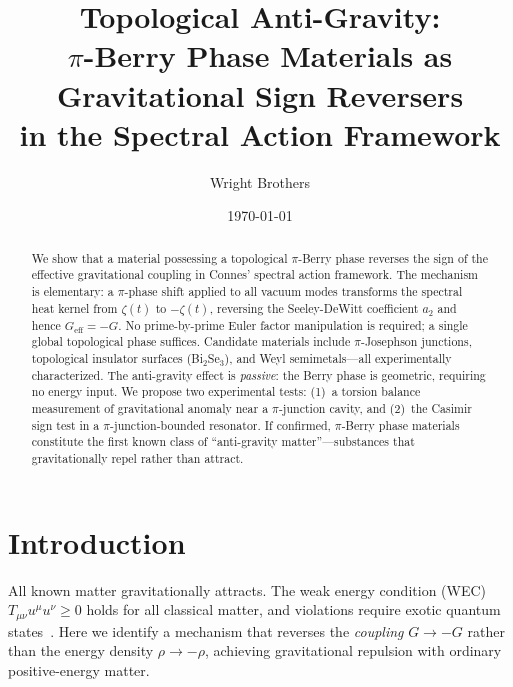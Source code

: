\documentclass[aps,prl,twocolumn,superscriptaddress,nofootinbib]{revtex4-2}
\begin{document}
\title{Topological Anti-Gravity:\\
$\pi$-Berry Phase Materials as Gravitational Sign Reversers\\
in the Spectral Action Framework}

\author{Wright Brothers}
\date{\today}

\begin{abstract}
We show that a material possessing a topological $\pi$-Berry phase
reverses the sign of the effective gravitational coupling
in Connes' spectral action framework.
The mechanism is elementary:
a $\pi$-phase shift applied to all vacuum modes transforms the
spectral heat kernel from $\zeta(t)$ to $-\zeta(t)$,
reversing the Seeley-DeWitt coefficient $a_2$ and hence
$G_{\mathrm{eff}} = -G$.
No prime-by-prime Euler factor manipulation is required;
a single global topological phase suffices.
Candidate materials include
$\pi$-Josephson junctions,
topological insulator surfaces (Bi$_2$Se$_3$),
and Weyl semimetals---all experimentally characterized.
The anti-gravity effect is \emph{passive}:
the Berry phase is geometric, requiring no energy input.
We propose two experimental tests:
(1)~a torsion balance measurement of gravitational
anomaly near a $\pi$-junction cavity,
and (2)~the Casimir sign test in a $\pi$-junction-bounded resonator.
If confirmed, $\pi$-Berry phase materials constitute
the first known class of ``anti-gravity matter''---substances that
gravitationally repel rather than attract.
\end{abstract}

\maketitle

\section{Introduction}

All known matter gravitationally attracts.
The weak energy condition (WEC) $T_{\mu\nu} u^\mu u^\nu \geq 0$
holds for all classical matter, and violations require exotic
quantum states~\cite{PfenningFord1997}.
Here we identify a mechanism that reverses the \emph{coupling}
$G \to -G$ rather than the energy density $\rho \to -\rho$,
achieving gravitational repulsion with ordinary positive-energy matter.
\end{document}
